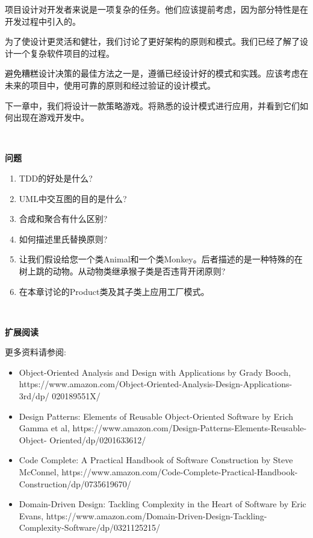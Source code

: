 项目设计对开发者来说是一项复杂的任务。他们应该提前考虑，因为部分特性是在开发过程中引入的。 \par
为了使设计更灵活和健壮，我们讨论了更好架构的原则和模式。我们已经了解了设计一个复杂软件项目的过程。 \par
避免糟糕设计决策的最佳方法之一是，遵循已经设计好的模式和实践。应该考虑在未来的项目中，使用可靠的原则和经过验证的设计模式。 \par
下一章中，我们将设计一款策略游戏。将熟悉的设计模式进行应用，并看到它们如何出现在游戏开发中。 \par

\noindent\textbf{}\ \par
\textbf{问题} \ \par
\begin{enumerate}
	\item TDD的好处是什么?
	\item UML中交互图的目的是什么?
	\item 合成和聚合有什么区别?
	\item 如何描述里氏替换原则?
	\item 让我们假设给您一个类Animal和一个类Monkey。后者描述的是一种特殊的在树上跳的动物。从动物类继承猴子类是否违背开闭原则?
	\item 在本章讨论的Product类及其子类上应用工厂模式。
\end{enumerate}

\noindent\textbf{}\ \par
\textbf{扩展阅读} \ \par
更多资料请参阅: \par
\begin{itemize}
	\item Object-Oriented Analysis and Design with Applications by Grady Booch,  https:/​/www.​amazon.​com/​Object-​Oriented-​Analysis-​Design-​Applications-​3rd/​dp/	020189551X/​
	\item Design Patterns: Elements of Reusable Object-Oriented Software by Erich Gamma et	al, https:/​/​www.​amazon.​com/​Design-​Patterns-​Elements-​Reusable-​Object-	Oriented/​dp/​0201633612/​
	\item Code Complete: A Practical Handbook of Software Construction by Steve McConnel, https://www.amazon.com/Code-Complete-Practical-Handbook-Construction/dp/0735619670/
	\item Domain-Driven Design: Tackling Complexity in the Heart of Software by Eric	Evans,  https:/​/​www.​amazon.​com/​Domain-​Driven-​Design-​Tackling-
	Complexity-​Software/​dp/​0321125215/
\end{itemize}

\newpage










